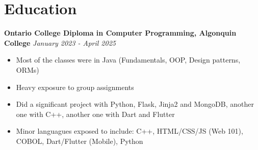 \section{Education}

\textbf{Ontario College Diploma in Computer Programming, Algonquin College}
\hfill \textit{January 2023 - April 2025}

\begin{itemize}
    \item Most of the classes were in Java (Fundamentals, OOP, Design patterns, ORMs)
    \item Heavy exposure to group assignments
    \item Did a significant project with Python, Flask, Jinja2 and MongoDB, another one with C++, another one with Dart and Flutter
    \item Minor languagues exposed to include: C++, HTML/CSS/JS (Web 101), COBOL, Dart/Flutter (Mobile), Python
\end{itemize}